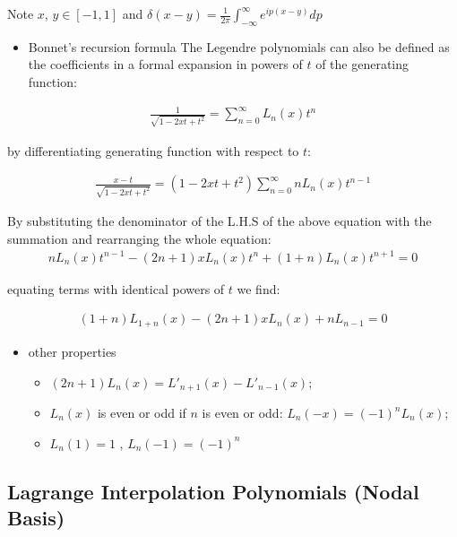 \documentclass[
  a4paper,
  10pt]{article}
\providecommand{\tightlist}{%
  \setlength{\itemsep}{0pt}\setlength{\parskip}{0pt}}
\begin{document}
Note \(x\), \(y\in [-1,1]\) and
\(\delta(x-y) = \frac{1}{2\pi}\int_{-\infty}^{\infty}e^{ip(x-y)}dp\)

\begin{itemize}
\tightlist
\item
  Bonnet's recursion formula The Legendre polynomials can also be
  defined as the coefficients in a formal expansion in powers of \(t\)
  of the generating function:
\end{itemize}

\begin{align}
\frac{1}{\sqrt{1-2xt+t^2}} = \sum_{n=0}^{\infty}L_n(x)t^n
\end{align}

by differentiating generating function with respect to \(t\):

\begin{align}
\frac{x-t}{\sqrt{1-2xt+t^2}} = (1-2xt+t^2)\sum_{n=0}^{\infty}nL_n(x)t^{n-1}
\end{align}

By substituting the denominator of the L.H.S of the above equation with
the summation and rearranging the whole equation: \begin{align}
nL_n(x)t^{n-1} - (2n+1)xL_n(x)t^n + (1+n)L_n(x)t^{n+1} = 0
\end{align}

equating terms with identical powers of \(t\) we find:

\begin{align}
(1+n)L_{1+n}(x) - (2n+1)xL_n(x) + nL_{n-1} = 0
\end{align}

\begin{itemize}
\tightlist
\item
  other properties

  \begin{itemize}
  \tightlist
  \item
    \((2n+1)L_n(𝑥)=L'_{n+1}(x)−L'_{n−1}(x)\);
  \item
    \(L_n(x)\) is even or odd if \(n\) is even or odd:
    \(L_{n}(-x)=(-1)^{n}L_{n}(x)\);
  \item
    \(L_n(1)=1\) , \(L_n(−1)=(−1)^n\)
  \end{itemize}
\end{itemize}

\hypertarget{lagrange-interpolation-polynomials-nodal-basis}{%
\subsection{Lagrange Interpolation Polynomials (Nodal
Basis)}\label{lagrange-interpolation-polynomials-nodal-basis}}
\end{document}
